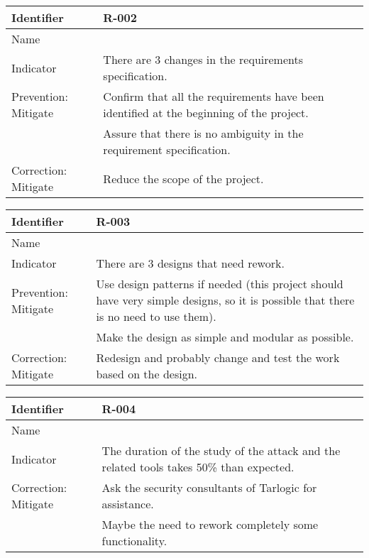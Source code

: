 \begin{table}[H]
	\begin{tabularx}{\textwidth}{|y|z|}
		\hline
		Identifier & \textbf{R-002} \\ \hline
		Name & \Rdos \\ \hline
		Indicator & There are 3 changes in the requirements specification.\\ \hline
		Prevention: Mitigate
			& Confirm that all the requirements have been identified at the beginning of the project.\\
			& Assure that there is no ambiguity in the requirement specification.\\ \hline
		Correction: Mitigate
			& Reduce the scope of the project.  \\ \hline
	\end{tabularx}
\end{table}

\begin{table}[H]
	\begin{tabularx}{\textwidth}{|y|z|}
		\hline
		Identifier & \textbf{R-003} \\ \hline
		Name & \Rtres \\ \hline
		Indicator & There are 3 designs that need rework.\\ \hline
		Prevention: Mitigate
			& Use design patterns if needed (this project should have very simple designs, so it is possible that there is no need to use them). \\
			& Make the design as simple and modular as possible. \\ \hline
		Correction: Mitigate
			& Redesign and probably change and test the work based on the design.\\ \hline
	\end{tabularx}
\end{table}

\begin{table}[H]
	\begin{tabularx}{\textwidth}{|y|z|}
		\hline
		Identifier & \textbf{R-004} \\ \hline
		Name & \Rcuatro \\ \hline
		Indicator & The duration of the study of the attack and the related tools takes 50\% than expected. \\ \hline
		Correction: Mitigate
			& Ask the security consultants of Tarlogic for assistance. \\
			& Maybe the need to rework completely some functionality. \\ \hline
	\end{tabularx}
\end{table}

